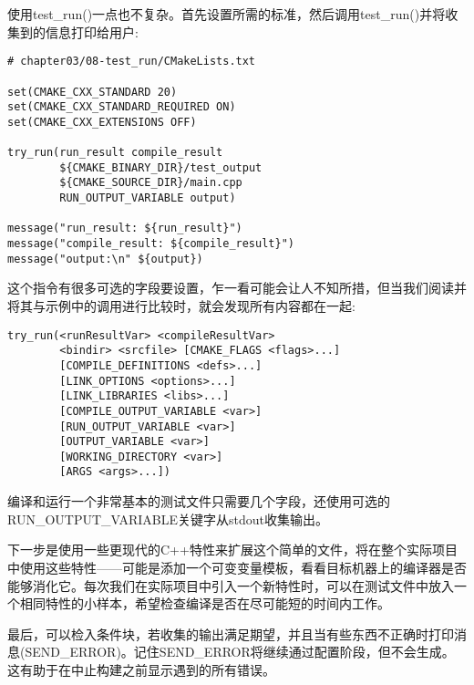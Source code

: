 使用test\_run()一点也不复杂。首先设置所需的标准，然后调用test\_run()并将收集到的信息打印给用户:

\begin{lstlisting}[style=styleCMake]
# chapter03/08-test_run/CMakeLists.txt

set(CMAKE_CXX_STANDARD 20)
set(CMAKE_CXX_STANDARD_REQUIRED ON)
set(CMAKE_CXX_EXTENSIONS OFF)

try_run(run_result compile_result
		${CMAKE_BINARY_DIR}/test_output
		${CMAKE_SOURCE_DIR}/main.cpp
		RUN_OUTPUT_VARIABLE output)
		
message("run_result: ${run_result}")
message("compile_result: ${compile_result}")
message("output:\n" ${output})
\end{lstlisting}

这个指令有很多可选的字段要设置，乍一看可能会让人不知所措，但当我们阅读并将其与示例中的调用进行比较时，就会发现所有内容都在一起:

\begin{lstlisting}[style=styleCMake]
try_run(<runResultVar> <compileResultVar>
		<bindir> <srcfile> [CMAKE_FLAGS <flags>...]
		[COMPILE_DEFINITIONS <defs>...]
		[LINK_OPTIONS <options>...]
		[LINK_LIBRARIES <libs>...]
		[COMPILE_OUTPUT_VARIABLE <var>]
		[RUN_OUTPUT_VARIABLE <var>]
		[OUTPUT_VARIABLE <var>]
		[WORKING_DIRECTORY <var>]
		[ARGS <args>...])
\end{lstlisting}

编译和运行一个非常基本的测试文件只需要几个字段，还使用可选的RUN\_OUTPUT\_VARIABLE关键字从stdout收集输出。

下一步是使用一些更现代的C++特性来扩展这个简单的文件，将在整个实际项目中使用这些特性——可能是添加一个可变变量模板，看看目标机器上的编译器是否能够消化它。每次我们在实际项目中引入一个新特性时，可以在测试文件中放入一个相同特性的小样本，希望检查编译是否在尽可能短的时间内工作。

最后，可以检入条件块，若收集的输出满足期望，并且当有些东西不正确时打印消息(SEND\_ERROR)。记住SEND\_ERROR将继续通过配置阶段，但不会生成。这有助于在中止构建之前显示遇到的所有错误。



















